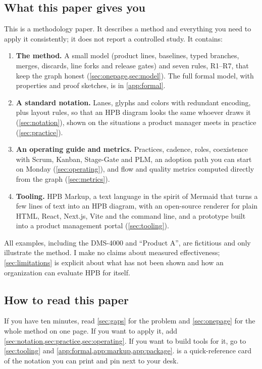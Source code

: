 \subsection{What this paper gives you}
\label{sec:intro-gives}

This is a methodology paper. It describes a method and everything you need
to apply it consistently; it does not report a controlled study. It
contains:
\begin{enumerate}[label=\textbf{\arabic*.},leftmargin=2em,itemsep=2pt,topsep=3pt]
  \item \textbf{The method.} A small model (product lines, baselines,
        typed branches, merges, discards, line forks and release gates)
        and seven rules, R1--R7, that keep the graph honest
        (\cref{sec:onepage,sec:model}). The full formal model, with
        properties and proof sketches, is in \cref{app:formal}.
  \item \textbf{A standard notation.} Lanes, glyphs and colors with
        redundant encoding, plus layout rules, so that an HPB diagram looks
        the same whoever draws it (\cref{sec:notation}), shown on the
        situations a product manager meets in practice
        (\cref{sec:practice}).
  \item \textbf{An operating guide and metrics.} Practices, cadence, roles,
        coexistence with Scrum, Kanban, Stage-Gate and PLM, an adoption
        path you can start on Monday (\cref{sec:operating}), and flow and
        quality metrics computed directly from the graph
        (\cref{sec:metrics}).
  \item \textbf{Tooling.} HPB Markup, a text language in the spirit of
        Mermaid that turns a few lines of text into an HPB diagram, with an
        open-source renderer for plain HTML, React, Next.js, Vite and the
        command line, and a prototype built into a product management
        portal (\cref{sec:tooling}).
\end{enumerate}
All examples, including the DMS-4000 and ``Product A'', are fictitious and
only illustrate the method. I make no claims about measured effectiveness;
\cref{sec:limitations} is explicit about what has not been shown and how
an organization can evaluate HPB for itself.

\subsection{How to read this paper}
\label{sec:intro-read}

If you have ten minutes, read \cref{sec:gaps} for the problem and
\cref{sec:onepage} for the whole method on one page. If you want to apply
it, add \cref{sec:notation,sec:practice,sec:operating}. If you want to
build tools for it, go to \cref{sec:tooling} and
\cref{app:formal,app:markup,app:package}.  is a
quick-reference card of the notation you can print and pin next to your
desk.
